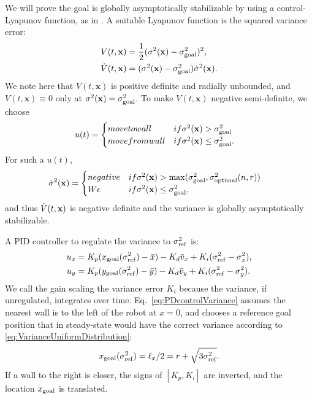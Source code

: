 We will prove the goal is globally asymptotically stabilizable by using a control-Lyapunov function, as in \cite{Lyapunov1992}.  A suitable Lyapunov function is the squared variance error:
\begin{align}
\label{eq:LyapunovVariance}
V(t,\bf{x})  &= \frac{1}{2} (\sigma^2(\mathbf{x}) - \sigma^2_{\rm{goal}})^2,\nonumber\\
\dot{V}(t,\bf{x}) &= (\sigma^2(\mathbf{x})-\sigma^2_{\rm{goal}})\dot{\sigma}^2(\mathbf{x}).
\end{align}
We note here that $V(t,\mathbf{x})$ is positive definite and radially unbounded, and $V(t,\mathbf{x}) \equiv 0$ only at $\sigma^2(\mathbf{x}) = \sigma^2_{\rm{goal}}$.
To make $\dot{V}(t,\mathbf{x})$ negative semi-definite, we choose
\begin{align}\label{eq:controlVariance}
u(t) &=   \begin{cases}
	 \mbox{move to wall} &\mbox{if } \sigma^2(\mathbf{x})>\sigma^2_{\rm{goal}} \\ 
	 \mbox{move from wall} & \mbox{if } \sigma^2(\mathbf{x}) \le \sigma^2_{\rm{goal}}.
\end{cases} 
\end{align}
 For such a $u(t)$,
 \begin{align}
\dot{\sigma}^2(\mathbf{x}) &=   \begin{cases}
	 \mbox{negative} &\mbox{if } \sigma^2(\mathbf{x})> \max(\sigma^2_{\rm{goal}}, \sigma^2_{\rm{optimal}}(n,r))  \\ 
	 W \epsilon & \mbox{if } \sigma^2(\mathbf{x}) \le \sigma^2_{\rm{goal}},
\end{cases} 
\end{align} and thus
$\dot{V}(t,{\bf x})$ is negative definite and the variance is globally asymptotically stabilizable.%



A PID controller to regulate the variance to $\sigma^2_{\rm{ref}}$ is:
\begin{align}
u_x &= K_{p}(x_{\rm{goal}}(\sigma^2_{\rm{ref}}) - \bar{x}) - K_{d}\bar{v}_x + K_{i}(\sigma^2_{\rm{ref}}-\sigma^2_{x}), \nonumber\\
u_y &= K_{p}(y_{\rm{goal}}(\sigma^2_{\rm{ref}})  - \bar{y}) - K_{d}\bar{v}_y + K_{i}(\sigma^2_{\rm{ref}}-\sigma^2_{y}).  \label{eq:PDcontrolVariance}
\end{align}
We call the gain scaling the variance error $K_i$ because the variance, if unregulated, integrates over time.
Eq.~\eqref{eq:PDcontrolVariance} assumes the nearest wall is to the left of the robot at $x=0$, and chooses a reference goal position that in steady-state would have the correct variance according to \eqref{eq:VarianceUniformDistribution}:
\begin{align}
x_{\rm{goal}}(\sigma^2_{\rm{ref}}) = \ell_x/2 = r + \sqrt{3\sigma^2_{\rm{ref}}}.
\end{align}
 If a wall to the right is closer, the signs of $[K_p,K_i]$ are inverted, and the location $x_{\rm{goal}}$ is translated.  


